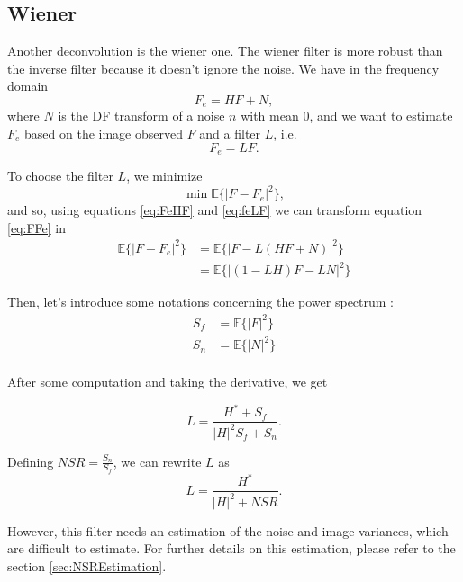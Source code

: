 \subsection{Wiener}
 Another deconvolution is the wiener one. The wiener filter is more robust than the inverse filter because it doesn't ignore the noise. We have in the frequency domain
\begin{equation}
F_e = HF + N,
\label{eq:FeHF}
\end{equation} 
 where $N$ is the DF transform of a noise $n$ with mean $0$, and we want to estimate $F_e$ based on the image observed $F$ and a filter $L$, i.e. 
 \begin{equation}
 F_e = LF.
 \label{eq:feLF}
 \end{equation}

To choose the filter $L$, we minimize 
\begin{equation}
\min \mathbb{E}\{|F - F_e|^2\},
\label{eq:FFe}
\end{equation}
and so, using equations \eqref{eq:FeHF} and \eqref{eq:feLF} we can transform equation \eqref{eq:FFe} in 
\begin{align}
\mathbb{E}\{|F - F_e|^2\} &= \mathbb{E}\{|F - L(HF+N)|^2\}\\
	&= \mathbb{E}\{|(1-LH)F - LN|^2\}
\end{align}

Then, let's introduce some notations concerning the power spectrum :
\begin{align}
S_f &= \mathbb{E}\{|F|^2\}\\
S_n &= \mathbb{E}\{|N|^2\}\\
\end{align}

After some computation and taking the derivative, we get

\begin{equation}
L = \frac{H^*+S_f}{|H|^2 S_f + S_n}.
\label{eq:LsemiFinal}
\end{equation}

Defining $NSR = \frac{S_n}{S_f}$, we can rewrite $L$ as 
\begin{equation}
L = \frac{H^*}{|H|^2 + NSR}.
\end{equation}

However, this filter needs an estimation of the noise and image variances, which are difficult to estimate. For further details on this estimation, please refer to the section \ref{sec:NSREstimation}.

